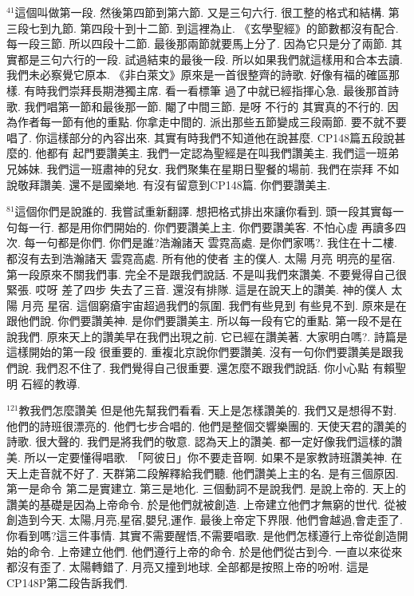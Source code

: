 \documentclass{book}
\begin{document}
$^{41}$這個叫做第一段.
然後第四節到第六節.
又是三句六行.
很工整的格式和結構.
第三段七到九節.
第四段十到十二節.
到這裡為止.
《玄學聖經》的節數都沒有配合.
每一段三節.
所以四段十二節.
最後那兩節就要馬上分了.
因為它只是分了兩節.
其實都是三句六行的一段.
試過結束的最後一段.
所以如果我們就這樣用和合本去讀.
我們未必察覺它原本.
《非白萊文》原來是一首很整齊的詩歌.
好像有福的確區那樣.
有時我們崇拜長期港獨主席.
看一看標筆 過了中就已經指揮心急.
最後那首詩歌.
我們唱第一節和最後那一節.
閹了中間三節.
是呀 不行的 其實真的不行的.
因為作者每一節有他的重點.
你拿走中間的.
派出那些五節變成三段兩節.
要不就不要唱了.
你這樣部分的內容出來.
其實有時我們不知道他在說甚麼.
CP148篇五段說甚麼的.
他都有 起門要讚美主.
我們一定認為聖經是在叫我們讚美主.
我們這一班弟兄姊妹.
我們這一班肅神的兒女.
我們聚集在星期日聖餐的場前.
我們在崇拜 不如說敬拜讚美.
還不是國樂地.
有沒有留意到CP148篇.
你們要讚美主.

$^{81}$這個你們是說誰的.
我嘗試重新翻譯.
想把格式排出來讓你看到.
頭一段其實每一句每一行.
都是用你們開始的.
你們要讚美上主.
你們要讚美客.
不怕心虛 再讀多四次.
每一句都是你們.
你們是誰?浩瀚諸天 雲霓高處.
是你們家嗎?.
我住在十二樓.
都沒有去到浩瀚諸天 雲霓高處.
所有他的使者 主的僕人.
太陽 月亮 明亮的星宿.
第一段原來不關我們事.
完全不是跟我們說話.
不是叫我們來讚美.
不要覺得自己很緊張.
哎呀 差了四步 失去了三音.
還沒有排隊.
這是在說天上的讚美.
神的僕人 太陽 月亮 星宿.
這個窮瘡宇宙超過我們的氛圍.
我們有些見到 有些見不到.
原來是在跟他們說.
你們要讚美神.
是你們要讚美主.
所以每一段有它的重點.
第一段不是在說我們.
原來天上的讚美早在我們出現之前.
它已經在讚美著.
大家明白嗎?.
詩篇是這樣開始的第一段 很重要的.
重複北京說你們要讚美.
沒有一句你們要讚美是跟我們說.
我們忍不住了.
我們覺得自己很重要.
還怎麼不跟我們說話.
你小心點 有賴聖明 石經的教導.

$^{121}$教我們怎麼讚美 但是他先幫我們看看.
天上是怎樣讚美的.
我們又是想得不對.
他們的詩班很漂亮的.
他們七步合唱的.
他們是整個交響樂團的.
天使天君的讚美的詩歌.
很大聲的.
我們是將我們的敬意.
認為天上的讚美.
都一定好像我們這樣的讚美.
所以一定要懂得唱歌.
「阿彼日」你不要走音啊.
如果不是家教詩班讚美神.
在天上走音就不好了.
天群第二段解釋給我們聽.
他們讚美上主的名.
是有三個原因.
第一是命令 第二是實建立.
第三是地化.
三個動詞不是說我們.
是說上帝的.
天上的讚美的基礎是因為上帝命令.
於是他們就被創造.
上帝建立他們才無窮的世代.
從被創造到今天.
太陽,月亮,星宿,嬰兒,運作.
最後上帝定下界限.
他們會越過,會走歪了.
你看到嗎?這三件事情.
其實不需要醒悟,不需要唱歌.
是他們怎樣遵行上帝從創造開始的命令.
上帝建立他們.
他們遵行上帝的命令.
於是他們從古到今.
一直以來從來都沒有歪了.
太陽轉錯了.
月亮又撞到地球.
全部都是按照上帝的吩咐.
這是CP148P第二段告訴我們.
\end{document}
